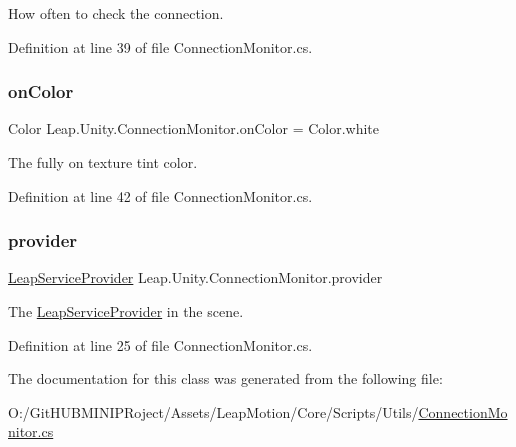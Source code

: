 How often to check the connection. 

Definition at line 39 of file Connection\+Monitor.\+cs.

\mbox{\label{class_leap_1_1_unity_1_1_connection_monitor_a685d929118dcc2b6261472e3f684e68a}} 
\subsubsection{\texorpdfstring{onColor}{onColor}}
{\footnotesize\ttfamily Color Leap.\+Unity.\+Connection\+Monitor.\+on\+Color = Color.\+white}

The fully on texture tint color. 

Definition at line 42 of file Connection\+Monitor.\+cs.

\mbox{\label{class_leap_1_1_unity_1_1_connection_monitor_ab14509887e80bba36c5b110551f6f555}} 
\subsubsection{\texorpdfstring{provider}{provider}}
{\footnotesize\ttfamily \mbox{\hyperlink{class_leap_1_1_unity_1_1_leap_service_provider}{Leap\+Service\+Provider}} Leap.\+Unity.\+Connection\+Monitor.\+provider}

The \mbox{\hyperlink{class_leap_1_1_unity_1_1_leap_service_provider}{Leap\+Service\+Provider}} in the scene. 

Definition at line 25 of file Connection\+Monitor.\+cs.



The documentation for this class was generated from the following file\+:\begin{DoxyCompactItemize}
\item 
O\+:/\+Git\+H\+U\+B\+M\+I\+N\+I\+P\+Roject/\+Assets/\+Leap\+Motion/\+Core/\+Scripts/\+Utils/\mbox{\hyperlink{_connection_monitor_8cs}{Connection\+Monitor.\+cs}}\end{DoxyCompactItemize}
